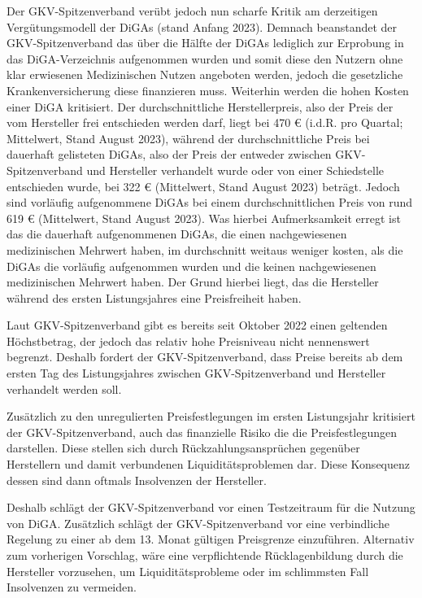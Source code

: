 \documentclass{article}
\begin{document}
			Der GKV-Spitzenverband verübt jedoch nun scharfe Kritik am derzeitigen Vergütungsmodell der DiGAs (stand Anfang 2023). Demnach beanstandet der GKV-Spitzenverband das über die Hälfte der DiGAs lediglich zur Erprobung in das DiGA-Verzeichnis aufgenommen wurden und somit diese den Nutzern ohne klar erwiesenen Medizinischen Nutzen angeboten werden, jedoch die gesetzliche Krankenversicherung diese finanzieren muss. Weiterhin werden die hohen Kosten einer DiGA kritisiert. Der durchschnittliche Herstellerpreis, also der Preis der vom Hersteller frei entschieden werden darf, liegt bei 470 € (i.d.R. pro Quartal; Mittelwert, Stand August 2023), während der durchschnittliche Preis bei dauerhaft gelisteten DiGAs, also der Preis der entweder zwischen GKV-Spitzenverband und Hersteller verhandelt wurde oder von einer Schiedstelle entschieden wurde, bei 322 € (Mittelwert, Stand August 2023) beträgt. Jedoch sind vorläufig aufgenommene DiGAs bei einem durchschnittlichen Preis von rund 619 € (Mittelwert, Stand August 2023). Was hierbei Aufmerksamkeit erregt ist das die dauerhaft aufgenommenen DiGAs, die einen nachgewiesenen medizinischen Mehrwert haben, im durchschnitt weitaus weniger kosten, als die DiGAs die vorläufig aufgenommen wurden und die keinen nachgewiesenen medizinischen Mehrwert haben. Der Grund hierbei liegt, das die Hersteller während des ersten Listungsjahres eine Preisfreiheit haben.\par    
			Laut GKV-Spitzenverband gibt es bereits seit Oktober 2022 einen geltenden Höchstbetrag, der jedoch das relativ hohe Preisniveau nicht nennenswert begrenzt. Deshalb fordert der GKV-Spitzenverband, dass Preise bereits ab dem ersten Tag des Listungsjahres zwischen GKV-Spitzenverband und Hersteller verhandelt werden soll.\par 
			Zusätzlich zu den unregulierten Preisfestlegungen im ersten Listungsjahr kritisiert der GKV-Spitzenverband, auch das finanzielle Risiko die die Preisfestlegungen darstellen. Diese stellen sich durch Rückzahlungsansprüchen gegenüber Herstellern und damit verbundenen Liquiditätsproblemen dar. Diese Konsequenz dessen sind dann oftmals Insolvenzen der Hersteller.\par 
			Deshalb schlägt der GKV-Spitzenverband vor einen Testzeitraum für die Nutzung von DiGA. Zusätzlich schlägt der GKV-Spitzenverband vor eine verbindliche Regelung zu einer ab dem 13. Monat gültigen Preisgrenze einzuführen. Alternativ zum vorherigen Vorschlag, wäre eine verpflichtende Rücklagenbildung durch die Hersteller vorzusehen, um Liquiditätsprobleme oder im schlimmsten Fall Insolvenzen zu vermeiden.    	
			\newpage	     
\end{document}
